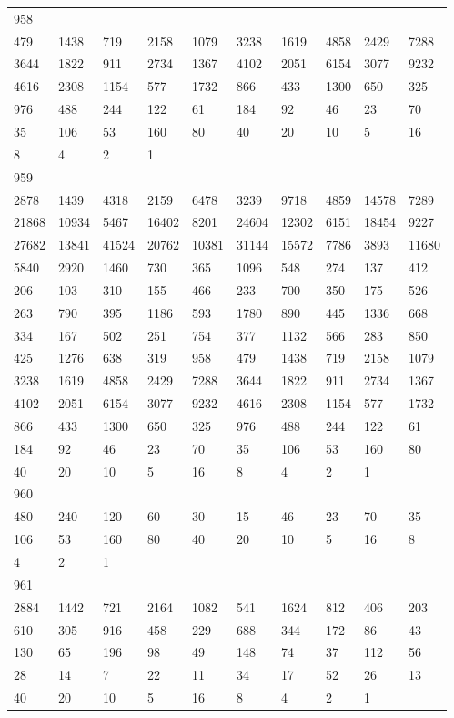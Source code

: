\begin{longtable}{*{10}{l}}
958&&&&&&&&&\\
479& 1438& 719& 2158& 1079& 3238& 1619& 4858& 2429& 7288\\
3644& 1822& 911& 2734& 1367& 4102& 2051& 6154& 3077& 9232\\
4616& 2308& 1154& 577& 1732& 866& 433& 1300& 650& 325\\
976& 488& 244& 122& 61& 184& 92& 46& 23& 70\\
35& 106& 53& 160& 80& 40& 20& 10& 5& 16\\
8& 4& 2& 1& \\

959&&&&&&&&&\\
2878& 1439& 4318& 2159& 6478& 3239& 9718& 4859& 14578& 7289\\
21868& 10934& 5467& 16402& 8201& 24604& 12302& 6151& 18454& 9227\\
27682& 13841& 41524& 20762& 10381& 31144& 15572& 7786& 3893& 11680\\
5840& 2920& 1460& 730& 365& 1096& 548& 274& 137& 412\\
206& 103& 310& 155& 466& 233& 700& 350& 175& 526\\
263& 790& 395& 1186& 593& 1780& 890& 445& 1336& 668\\
334& 167& 502& 251& 754& 377& 1132& 566& 283& 850\\
425& 1276& 638& 319& 958& 479& 1438& 719& 2158& 1079\\
3238& 1619& 4858& 2429& 7288& 3644& 1822& 911& 2734& 1367\\
4102& 2051& 6154& 3077& 9232& 4616& 2308& 1154& 577& 1732\\
866& 433& 1300& 650& 325& 976& 488& 244& 122& 61\\
184& 92& 46& 23& 70& 35& 106& 53& 160& 80\\
40& 20& 10& 5& 16& 8& 4& 2& 1& \\

960&&&&&&&&&\\
480& 240& 120& 60& 30& 15& 46& 23& 70& 35\\
106& 53& 160& 80& 40& 20& 10& 5& 16& 8\\
4& 2& 1& \\

961&&&&&&&&&\\
2884& 1442& 721& 2164& 1082& 541& 1624& 812& 406& 203\\
610& 305& 916& 458& 229& 688& 344& 172& 86& 43\\
130& 65& 196& 98& 49& 148& 74& 37& 112& 56\\
28& 14& 7& 22& 11& 34& 17& 52& 26& 13\\
40& 20& 10& 5& 16& 8& 4& 2& 1& \\


\end{longtable}
